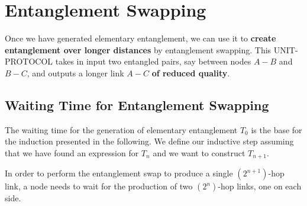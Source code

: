 \documentclass{masterthesis}
\begin{document}




\section{Entanglement Swapping}

Once we have generated elementary entanglement, we can use it to \textbf{create entanglement over longer distances} by entanglement swapping.
This UNIT-PROTOCOL takes in input two entangled pairs, say between nodes $A-B$ and $B-C$, and outputs a longer link $A-C$ \textbf{of reduced quality}. 

\subsection{Waiting Time for Entanglement Swapping}

The waiting time for the generation of elementary entanglement $T_0$ is the base for the induction presented in the following.
We define our inductive step assuming that we have found an expression for $T_n$ and we want to construct $T_{n+1}$. 

In order to perform the entanglement swap to produce a single $(2^{n+1})$-hop link, a node needs to wait for the production of two $(2^n)$-hop links, one on each side. 
\end{document}
